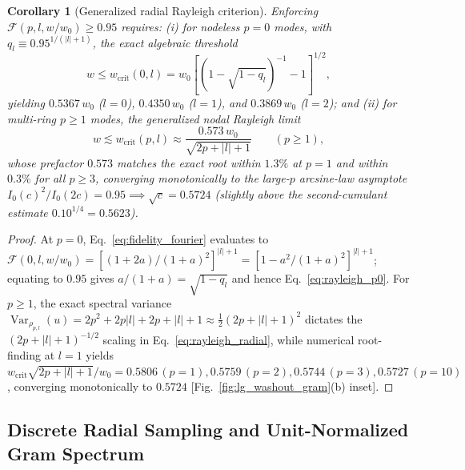 \documentclass[aps,pra,reprint,nofootinbib,floatfix,longbibliography]{revtex4-2}
\newtheorem{corollary}{Corollary}
\theoremstyle{remark}
\newcommand{\abs}[1]{\lvert #1 \rvert}
\begin{document}
\begin{corollary}[Generalized radial Rayleigh criterion]
\label{cor:rayleigh_radial}
Enforcing $\mathcal{F}(p,l,w/w_0) \ge 0.95$ requires: (i) for nodeless $p = 0$ modes, with $q_l \equiv 0.95^{1/(\abs{l}+1)}$, the exact algebraic threshold
\begin{equation}
w \le w_{\mathrm{crit}}(0,l) = w_0 \left[\left(1 - \sqrt{1 - q_l}\right)^{-1} - 1\right]^{1/2},
\label{eq:rayleigh_p0}
\end{equation}
yielding $0.5367\,w_0$ ($l = 0$), $0.4350\,w_0$ ($l = 1$), and $0.3869\,w_0$ ($l = 2$); and (ii) for multi-ring $p \ge 1$ modes, the generalized nodal Rayleigh limit
\begin{equation}
w \lesssim w_{\mathrm{crit}}(p,l) \approx \frac{0.573\,w_0}{\sqrt{2p + \abs{l} + 1}} \qquad (p \ge 1),
\label{eq:rayleigh_radial}
\end{equation}
whose prefactor $0.573$ matches the exact root within $1.3\%$ at $p = 1$ and within $0.3\%$ for all $p \ge 3$, converging monotonically to the large-$p$ arcsine-law asymptote $I_0(c)^2/I_0(2c) = 0.95 \implies \sqrt{c} = 0.5724$ (slightly above the second-cumulant estimate $0.10^{1/4} = 0.5623$).
\end{corollary}
\begin{proof}
At $p = 0$, Eq.~\eqref{eq:fidelity_fourier} evaluates to $\mathcal{F}(0,l,w/w_0) = [(1+2a)/(1+a)^2]^{\abs{l}+1} = [1 - a^2/(1+a)^2]^{\abs{l}+1}$; equating to $0.95$ gives $a/(1+a) = \sqrt{1 - q_l}$ and hence Eq.~\eqref{eq:rayleigh_p0}. For $p \ge 1$, the exact spectral variance $\operatorname{Var}_{\rho_{p,l}}(u) = 2p^2 + 2p\abs{l} + 2p + \abs{l} + 1 \approx \frac{1}{2}(2p+\abs{l}+1)^2$ dictates the $(2p+\abs{l}+1)^{-1/2}$ scaling in Eq.~\eqref{eq:rayleigh_radial}, while numerical root-finding at $l = 1$ yields $w_{\mathrm{crit}}\sqrt{2p+\abs{l}+1}/w_0 = 0.5806\,(p=1), 0.5759\,(p=2), 0.5744\,(p=3), 0.5727\,(p=10)$, converging monotonically to $0.5724$ [Fig.~\ref{fig:lg_washout_gram}(b) inset].
\end{proof}

\subsection{Discrete Radial Sampling and Unit-Normalized Gram Spectrum}
\label{subsec:gram_sampling}
\end{document}
